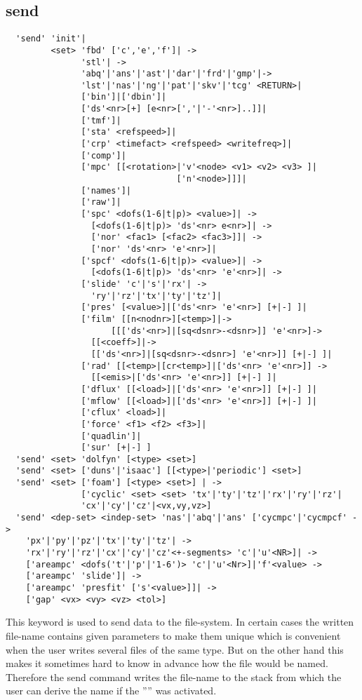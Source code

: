 \documentclass{article}
\begin{document}
\subsection{\label{send}send}
\begin{verbatim}
  'send' 'init'|
         <set> 'fbd' ['c','e','f']| ->
               'stl'| ->
               'abq'|'ans'|'ast'|'dar'|'frd'|'gmp'|->
               'lst'|'nas'|'ng'|'pat'|'skv'|'tcg' <RETURN>|
               ['bin']|['dbin']|
               ['ds'<nr>[+] [e<nr>[','|'-'<nr>]..]]|
               ['tmf']|
               ['sta' <refspeed>]|
               ['crp' <timefact> <refspeed> <writefreq>]|
               ['comp']|
               ['mpc' [[<rotation>|'v'<node> <v1> <v2> <v3> ]|
                                  ['n'<node>]]]|
               ['names']|
               ['raw']|
               ['spc' <dofs(1-6|t|p)> <value>]| ->
                 [<dofs(1-6|t|p)> 'ds'<nr> e<nr>]| ->
                 ['nor' <fac1> [<fac2> <fac3>]]| ->
                 ['nor' 'ds'<nr> 'e'<nr>]|
               ['spcf' <dofs(1-6|t|p)> <value>]| ->
                 [<dofs(1-6|t|p)> 'ds'<nr> 'e'<nr>]| ->
               ['slide' 'c'|'s'|'rx'| ->
                 'ry'|'rz'|'tx'|'ty'|'tz']|
               ['pres' [<value>]|['ds'<nr> 'e'<nr>] [+|-] ]|
               ['film' [[n<nodnr>][<temp>]|->
                     [[['ds'<nr>]|[sq<dsnr>-<dsnr>]] 'e'<nr>]->
                 [[<coeff>]|->
                 [['ds'<nr>]|[sq<dsnr>-<dsnr>] 'e'<nr>]] [+|-] ]| 
               ['rad' [[<temp>|[cr<temp>]|['ds'<nr> 'e'<nr>]] ->
                 [[<emis>|['ds'<nr> 'e'<nr>]] [+|-] ]|
               ['dflux' [[<load>]|['ds'<nr> 'e'<nr>]] [+|-] ]|
               ['mflow' [[<load>]|['ds'<nr> 'e'<nr>]] [+|-] ]|
               ['cflux' <load>]| 
               ['force' <f1> <f2> <f3>]|
               ['quadlin']|
               ['sur' [+|-] ]
  'send' <set> 'dolfyn' [<type> <set>] 
  'send' <set> ['duns'|'isaac'] [[<type>|'periodic'] <set>] 
  'send' <set> ['foam'] [<type> <set>] | ->
               ['cyclic' <set> <set> 'tx'|'ty'|'tz'|'rx'|'ry'|'rz'|
               'cx'|'cy'|'cz'|<vx,vy,vz>] 
  'send' <dep-set> <indep-set> 'nas'|'abq'|'ans' ['cycmpc'|'cycmpcf' ->
    'px'|'py'|'pz'|'tx'|'ty'|'tz'| ->
    'rx'|'ry'|'rz'|'cx'|'cy'|'cz'<+-segments> 'c'|'u'<NR>]| ->
    ['areampc' <dofs('t'|'p'|'1-6')> 'c'|'u'<Nr>]|'f'<value> ->
    ['areampc' 'slide']| ->
    ['areampc' 'presfit' ['s'<value>]]| ->
    ['gap' <vx> <vy> <vz> <tol>] 
\end{verbatim}
This keyword is used to send data to the file-system. In certain cases the written file-name contains given parameters to make them unique which is convenient when the user writes several files of the same type. But on the other hand this makes it sometimes hard to know in advance how the file would be named. Therefore the send command writes the file-name to the stack from which the user can derive the name if the '''' was activated.
\end{document}
